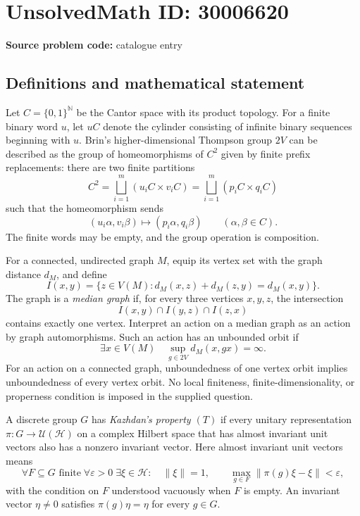 \documentclass[11pt]{article}
\newcommand{\N}{\mathbb{N}}
\begin{document}
\section*{UnsolvedMath ID: 30006620}
\textbf{Source problem code:} catalogue entry
\subsection{Definitions and mathematical statement}
Let \(C=\{0,1\}^{\N}\) be the Cantor space with its product topology. For a finite binary word \(u\), let \(uC\) denote the cylinder consisting of infinite binary sequences beginning with \(u\). Brin's higher-dimensional Thompson group \(2V\) can be described as the group of homeomorphisms of \(C^2\) given by finite prefix replacements: there are two finite partitions
\[
C^2=\bigsqcup_{i=1}^{m}(u_iC\times v_iC)
=\bigsqcup_{i=1}^{m}(p_iC\times q_iC)
\]
such that the homeomorphism sends
\[
(u_i\alpha,v_i\beta)\longmapsto(p_i\alpha,q_i\beta)
\qquad(\alpha,\beta\in C).
\]
The finite words may be empty, and the group operation is composition.

For a connected, undirected graph \(M\), equip its vertex set with the graph distance \(d_M\), and define
\[
I(x,y)=\{z\in V(M):d_M(x,z)+d_M(z,y)=d_M(x,y)\}.
\]
The graph is a \emph{median graph} if, for every three vertices \(x,y,z\), the intersection
\[
I(x,y)\cap I(y,z)\cap I(z,x)
\]
contains exactly one vertex. Interpret an action on a median graph as an action by graph automorphisms. Such an action has an unbounded orbit if
\[
\exists x\in V(M)\quad \sup_{g\in 2V}d_M(x,gx)=\infty.
\]
For an action on a connected graph, unboundedness of one vertex orbit implies unboundedness of every vertex orbit. No local finiteness, finite-dimensionality, or properness condition is imposed in the supplied question.

A discrete group \(G\) has \emph{Kazhdan's property \((T)\)} if every unitary representation \(\pi:G\to\mathcal U(\mathcal H)\) on a complex Hilbert space that has almost invariant unit vectors also has a nonzero invariant vector. Here almost invariant unit vectors means
\[
\forall F\subseteq G\text{ finite}\;\forall\varepsilon>0\;\exists\xi\in\mathcal H:
\quad \|\xi\|=1,\qquad
\max_{g\in F}\|\pi(g)\xi-\xi\|<\varepsilon,
\]
with the condition on \(F\) understood vacuously when \(F\) is empty. An invariant vector \(\eta\ne0\) satisfies \(\pi(g)\eta=\eta\) for every \(g\in G\).
\end{document}
